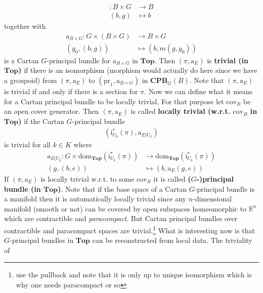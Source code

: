 \begin{exa}[Bundles 2]
\begin{align*}
  \colon
  B
  \times
  G
  &\rightarrow
  B
  \\
  (b,g)
  &\mapsto
  b
\end{align*}
together with
\begin{align*}
  \mathrm{a}_{B \times G}
  \colon
  G
  \times
  \left(
    B
    \times
    G
  \right)
  &\rightarrow
  B
  \times
  G
  \\
  (g_{0},(b,g))
  &\mapsto
  (b,m(g,g_{0}))
\end{align*}
is a Cartan $G$-principal bundle for $\mathrm{a}_{B \times G}$ in $\mathbf{Top}$. Then $(\pi,\mathrm{a}_{E})$ is \textbf{trivial (in $\mathbf{Top}$)} if there is an isomorphism (morphism would actually do here since we have a groupoid) from $(\pi,\mathrm{a}_{E})$ to $(\mathrm{pr}_{1},\mathrm{a}_{B \times G})$ in $\mathbf{CPB}_{G}(B)$. Note that $(\pi,\mathrm{a}_{E})$ is trivial if and only if there is a section for $\pi$. Now we can define what it means for a Cartan principal bundle to be locally trivial. For that purpose let $\mathrm{cov}_{B}$ be an open cover generator. Then $(\pi,\mathrm{a}_{E})$ is called \textbf{locally trivial (w.r.t. $\mathrm{cov}_{B}$ in $\mathbf{Top}$)} if the Cartan $G$-principal bundle
\begin{align*}
  \left(
    \mathrm{i}_{U_{k}}^{\ast}(\pi),
    \mathrm{a}_{E \vert U_{k}}
  \right)
\end{align*}
is trivial for all $k \in K$ where
\begin{align*}
  \mathrm{a}_{E \vert U_{k}}
  \colon
  G
  \times
  \mathrm{dom}_{\mathbf{Top}}
  \left(
    \mathrm{i}_{U_{k}}^{\ast}(\pi)
  \right)
  &\rightarrow
  \mathrm{dom}_{\mathbf{Top}}
  \left(
    \mathrm{i}_{U_{k}}^{\ast}(\pi)
  \right)
  \\
  (g,(b,e))
  &\mapsto
  (b,\mathrm{a}_{E}(g,e))
\end{align*}
If $(\pi,\mathrm{a}_{E})$ is locally trivial w.r.t. to some $\mathrm{cov}_{B}$ it is called \textbf{($G$-)principal bundle (in $\mathbf{Top}$)}. Note that if the base space of a Cartan $G$-principal bundle is a manifold then it is automatically locally trivial since any $n$-dimensional manifold (smooth or not) can be covered by open subspaces homeomorphic to $\mathbb{R}^{n}$ which are contractible and \textit{paracompact}. But Cartan principal bundles over contractible and paracompact spaces are trivial.\footnote{use the pullback and note that it is only up to unique isomorphism which is why one needs paracompact or so} What is interesting now is that $G$-principal bundles in $\mathbf{Top}$ can be reconstructed from local data. The triviality of

\end{exa}
